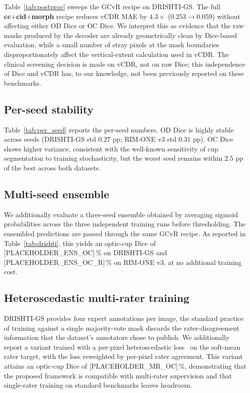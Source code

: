 \documentclass[10pt,journal,twocolumn]{IEEEtran}
\begin{document}
Table~\ref{tab:postproc} sweeps the GCvR recipe on DRISHTI-GS. The full \textbf{cc}+\textbf{cid}+\textbf{morph} recipe reduces vCDR MAE by $4.3\times$ ($0.253 \to 0.059$) without affecting either OD Dice or OC Dice. We interpret this as evidence that the raw masks produced by the decoder are already geometrically clean by Dice-based evaluation, while a small number of stray pixels at the mask boundaries disproportionately affect the vertical-extent calculation used in vCDR. The clinical screening decision is made on vCDR, not on raw Dice; this independence of Dice and vCDR has, to our knowledge, not been previously reported on these benchmarks.

\subsection{Per-seed stability}

Table~\ref{tab:per_seed} reports the per-seed numbers. OD Dice is highly stable across seeds (DRISHTI-GS std $0.27$ pp; RIM-ONE v3 std $0.31$ pp). OC Dice shows higher variance, consistent with the well-known sensitivity of cup segmentation to training stochasticity, but the worst seed remains within $2.5$ pp of the best across both datasets.

\subsection{Multi-seed ensemble}
We additionally evaluate a three-seed ensemble obtained by averaging sigmoid probabilities across the three independent training runs before thresholding. The ensembled predictions are passed through the same GCvR recipe. As reported in Table~\ref{tab:drishti}, this yields an optic-cup Dice of [PLACEHOLDER\_ENS\_OC]\,\% on DRISHTI-GS and [PLACEHOLDER\_ENS\_OC\_R]\,\% on RIM-ONE v3, at no additional training cost.

\subsection{Heteroscedastic multi-rater training}
DRISHTI-GS provides four expert annotations per image, the standard practice of training against a single majority-vote mask discards the rater-disagreement information that the dataset's annotators chose to publish. We additionally report a variant trained with a per-pixel heteroscedastic loss~\cite{kendall2017uncertainty} on the soft-mean rater target, with the loss reweighted by per-pixel rater agreement. This variant attains an optic-cup Dice of [PLACEHOLDER\_MR\_OC]\,\%, demonstrating that the proposed framework is compatible with multi-rater supervision and that single-rater training on standard benchmarks leaves headroom.
\end{document}
